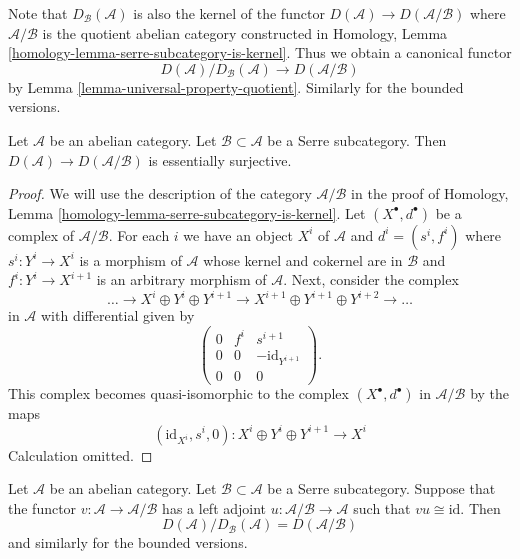 \medskip\noindent
Note that $D_\mathcal{B}(\mathcal{A})$ is also the kernel of the functor
$D(\mathcal{A}) \to D(\mathcal{A}/\mathcal{B})$
where $\mathcal{A}/\mathcal{B}$ is the quotient abelian category
constructed in
Homology, Lemma \ref{homology-lemma-serre-subcategory-is-kernel}.
Thus we obtain a canonical functor
$$
D(\mathcal{A})/D_\mathcal{B}(\mathcal{A})
\longrightarrow
D(\mathcal{A}/\mathcal{B})
$$
by
Lemma \ref{lemma-universal-property-quotient}.
Similarly for the bounded versions.

\begin{lemma}
\label{lemma-derived-of-quotient}
Let $\mathcal{A}$ be an abelian category.
Let $\mathcal{B} \subset \mathcal{A}$ be a Serre subcategory.
Then $D(\mathcal{A}) \to D(\mathcal{A}/\mathcal{B})$
is essentially surjective.
\end{lemma}

\begin{proof}
We will use the description of the category $\mathcal{A}/\mathcal{B}$
in the proof of
Homology, Lemma \ref{homology-lemma-serre-subcategory-is-kernel}.
Let $(X^\bullet, d^\bullet)$ be a complex of $\mathcal{A}/\mathcal{B}$.
For each $i$ we have an object $X^i$ of $\mathcal{A}$ and
$d^i = (s^i, f^i)$ where $s^i : Y^i \to X^i$ is a morphism of $\mathcal{A}$
whose kernel and cokernel are in $\mathcal{B}$ and $f^i : Y^i \to X^{i + 1}$
is an arbitrary morphism of $\mathcal{A}$. Next, consider the complex
$$
\ldots \to
X^i \oplus Y^i \oplus Y^{i + 1} \to 
X^{i + 1} \oplus Y^{i + 1} \oplus Y^{i + 2} \to \ldots
$$
in $\mathcal{A}$ with differential given by
$$
\left(
\begin{matrix}
0 & f^i & s^{i + 1} \\
0 & 0 & - \text{id}_{Y^{i + 1}} \\
0 & 0 & 0
\end{matrix}
\right).
$$
This complex becomes quasi-isomorphic to the complex $(X^\bullet, d^\bullet)$
in $\mathcal{A}/\mathcal{B}$ by the maps
$$
(\text{id}_{X^i}, s^i, 0) : X^i \oplus Y^i \oplus Y^{i + 1} \to X^i
$$
Calculation omitted.
\end{proof}

\begin{lemma}
\label{lemma-quotient-by-serre-easy}
Let $\mathcal{A}$ be an abelian category.
Let $\mathcal{B} \subset \mathcal{A}$ be a Serre subcategory.
Suppose that the functor $v : \mathcal{A} \to \mathcal{A}/\mathcal{B}$
has a left adjoint $u : \mathcal{A}/\mathcal{B} \to \mathcal{A}$
such that $vu \cong \text{id}$. Then
$$
D(\mathcal{A})/D_\mathcal{B}(\mathcal{A}) = D(\mathcal{A}/\mathcal{B})
$$
and similarly for the bounded versions.
\end{lemma}

